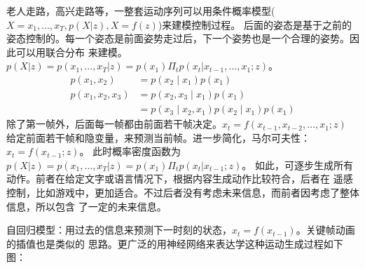 \documentclass[lang=cn,newtx,10pt,scheme=chinese]{elegantbook}
\begin{document}
老人走路，高兴走路等，一整套运动序列可以用条件概率模型($X={x_1, \dots, x_T}, p(X|z), X=f(z)$)来建模控制过程。
后面的姿态是基于之前的姿态控制的。每一个姿态是前面姿势走过后，下一个姿势也是一个合理的姿势。因此可以用联合分布
来建模。$p(X|z)=p(x_1, \dots, x_T|z)=p(x_1)\Pi_{t}p(x_t|x_{t-1},\dots, x_1;z)$。
\begin{equation}
  \begin{aligned}
  p\left(x_1, x_2\right) & =p\left(x_2 \mid x_1\right) p\left(x_1\right) \\
  p\left(x_1, x_2, x_3\right) & =p\left(x_2, x_3 \mid x_1\right) p\left(x_1\right) \\
  & =p\left(x_3 \mid x_2, x_1\right) p\left(x_2 \mid x_1\right) p\left(x_1\right)
  \end{aligned}
\end{equation}
除了第一帧外，后面每一帧都由前面若干帧决定。$x_t=f(x_{t-1}, x_{t-2}, \dots, x_1; z)$
给定前面若干帧和隐变量，来预测当前帧。进一步简化，马尔可夫性：$x_t = f(x_{t-1};z)$。
此时概率密度函数为$p(X|z)=p(x_1, \dots, x_T|z)=p(x_1)\Pi_{t}p(x_t|x_{t-1};z)$。
如此，可逐步生成所有动作。前者在给定文字或语言情况下，根据内容生成动作比较符合，后者在
遥感控制，比如游戏中，更加适合。不过后者没有考虑未来信息，而前者因考虑了整体信息，所以包含
了一定的未来信息。

自回归模型：用过去的信息来预测下一时刻的状态，$x_t = f(x_{t-1})$。关键帧动画的插值也是类似的
思路。更广泛的用神经网络来表达学这种运动生成过程如下图：
\end{document}
